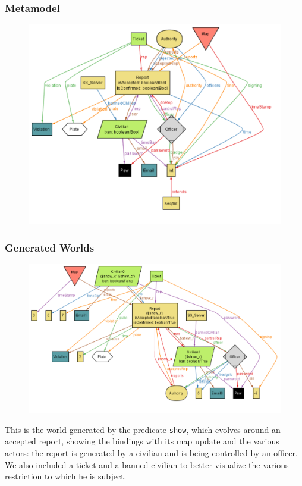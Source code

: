 \documentclass[12pt,a4paper]{article}
\begin{document}
\subsubsection{Metamodel}
\begin{figure}[H]
				\centering
				\includegraphics[]{Images/Alloy/metamodel}
\end{figure}
\subsubsection{Generated Worlds}
\begin{figure}[H]
				\centering
				\includegraphics[]{Images/Alloy/world}
\end{figure}
This is the world generated by the predicate \texttt{show}, which evolves around an accepted report, showing the bindings with its map update and the various actors: the report is generated by a civilian and is being controlled by an officer.
We also included a ticket and a banned civilian to better visualize the various restriction to which he is subject.
\end{document}
